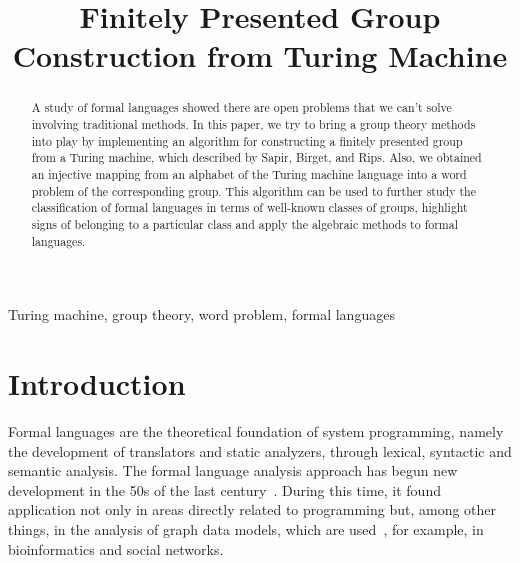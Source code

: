 \documentclass[conference]{IEEEtran}
\theoremstyle{definition}
\begin{document}
\title{Finitely Presented Group Construction from Turing Machine}

\author{
\and
{}
}

\maketitle

\begin{abstract}
A study of formal languages showed there are open problems that we can’t solve involving traditional methods. In this paper, we try to bring a group theory methods into play by implementing an algorithm for constructing a finitely presented group from a Turing machine, which described by Sapir, Birget, and Rips. Also, we obtained an injective mapping from an alphabet of the Turing machine language into a word problem of the corresponding group. This algorithm can be used to further study the classification of formal languages ​​in terms of well-known classes of groups, highlight signs of belonging to a particular class and apply the algebraic methods to formal languages.
\end{abstract}

\begin{IEEEkeywords}
Turing machine, group theory, word problem, formal languages
\end{IEEEkeywords}

\section{Introduction}

Formal languages are the theoretical foundation of system programming, namely the development of translators and static analyzers, through lexical, syntactic and semantic analysis.
The formal language analysis approach has begun new development in the 50s of the last century~\cite{chomsky1, chomsky2}.
During this time, it found application not only in areas directly related to programming but, among other things, in the analysis of graph data models, which are used~\cite{Hellings2015QueryingFP, Azimov2017ContextfreePQ},
for example, in bioinformatics and social networks.
\end{document}
